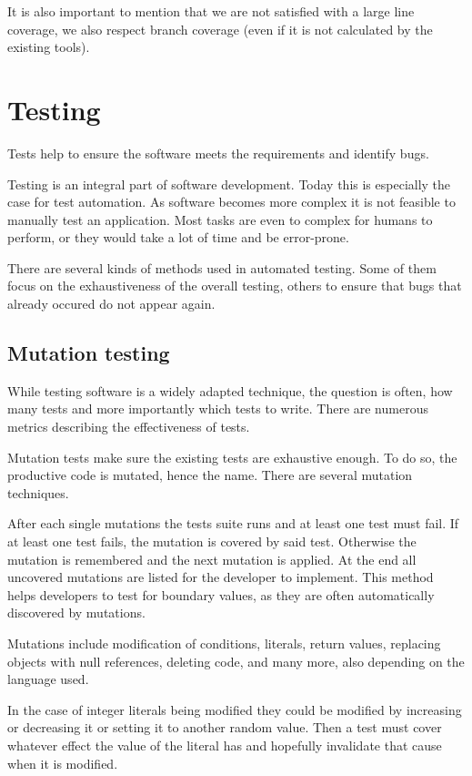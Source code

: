 It is also important to mention that we are not satisfied with a large line
coverage, we also respect branch coverage (even if it is not calculated by
the existing tools).

\section{Testing}

Tests help to ensure the software meets the requirements and identify bugs.

Testing is an integral part of software development. Today this is especially
the case for test automation. As software becomes more complex it is not
feasible to manually test an application. Most tasks are even to complex for
humans to perform, or they would take a lot of time and be error-prone.

There are several kinds of methods used in automated testing. Some of them
focus on the exhaustiveness of the overall testing, others to ensure that bugs
that already occured do not appear again.

\subsection{Mutation testing}

While testing software is a widely adapted technique, the question is often,
how many tests and more importantly which tests to write. There are numerous
metrics describing the effectiveness of tests.

Mutation tests make sure the existing tests are exhaustive enough. To do so,
the productive code is mutated, hence the name. There are several mutation
techniques.

After each single mutations the tests suite runs and at least one test must
fail. If at least one test fails, the mutation is covered by said test.
Otherwise the mutation is remembered and the next mutation is applied. At the
end all uncovered mutations are listed for the developer to implement. This
method helps developers to test for boundary values, as they are often
automatically discovered by mutations.

Mutations include modification of conditions, literals, return values,
replacing objects with null references, deleting code, and many more, also
depending on the language used.

In the case of integer literals being modified they could be modified by
increasing or decreasing it or setting it to another random value. Then a test
must cover whatever effect the value of the literal has and hopefully
invalidate that cause when it is modified.

